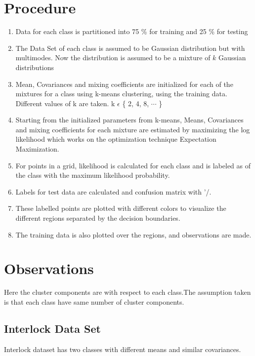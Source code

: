 \documentclass[a4paper]{article}
\begin{document}
\section{Procedure}
	\begin{enumerate}
	  \item {Data for each class is partitioned into 75 \% for training and 25
	  \% for testing }
	  \item {The Data Set of each class is assumed to be Gaussian distribution
	  but with multimodes. Now the distribution is assumed to be a mixture of
	  $k$ Gaussian distributions}
	  \item {Mean, Covariances and mixing coefficients are initialized for each
	  of the mixtures for a class using k-means clustering, using the training
	  data. Different values of k are taken. k $\epsilon$ \{ 2, 4, 8, $\cdots$ \} }
	  \item {Starting from the initialized parameters from k-means, Means,
	  Covariances and mixing coefficients for each mixture are estimated by
	  maximizing the log likelihood which works on the optimization technique
	  Expectation Maximization.}
	  \item {For points in a grid, likelihood is calculated for each class and is
	  labeled as of the class with the maximum likelihood probability.}
      \item {Labels for test data are calculated and confusion matrix with '/.}
	  \item {These labelled points are plotted with different colors to visualize
	  the different regions separated by the decision boundaries.}
	  \item {The training data is also plotted over the regions, and observations
	  are made.}
	\end{enumerate}

\vspace{1.0cm}


\section{Observations}
	Here the cluster components are with respect to each class.The assumption taken is that each class have same number of cluster components.
	\subsection{Interlock Data Set}
    Interlock dataset has two classes with different means and similar covariances.
    
\end{document}

